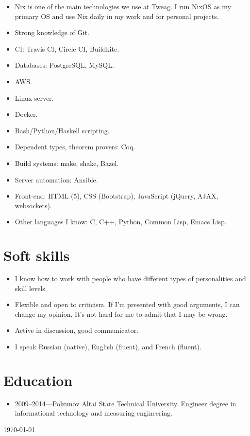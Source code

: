 \documentclass[a4paper,12pt]{article}
\begin{document}
\begin{itemize}[noitemsep]
\item Nix is one of the main technologies we use at Tweag. I run NixOS as my
  primary OS and use Nix daily in my work and for personal projects.
\item Strong knowledge of Git.
\item CI: Travis CI, Circle CI, Buildkite.
\item Databases: PostgreSQL, MySQL.
\item AWS.
\item Linux server.
\item Docker.
\item Bash/Python/Haskell scripting.
\item Dependent types, theorem provers: Coq.
\item Build systems: make, shake, Bazel.
\item Server automation: Ansible.
\item Front-end: HTML (5), CSS (Bootstrap), JavaScript (jQuery, AJAX,
  websockets).
\item Other languages I know: C, C++, Python, Common Lisp, Emacs Lisp.
\end{itemize}

\section*{Soft skills}

\begin{itemize}[noitemsep]
\item I know how to work with people who have different types of
  personalities and skill levels.
\item Flexible and open to criticism. If I'm presented with good arguments,
  I can change my opinion. It's not hard for me to admit that I may be
  wrong.
\item Active in discussion, good communicator.
\item I speak Russian (native), English (fluent), and French (fluent).
\end{itemize}

\section*{Education}

\begin{itemize}[noitemsep]
\item 2009--2014---Polzunov Altai State Technical University. Engineer
  degree in informational technology and measuring engineering.
\end{itemize}

\begin{flushright}
  \today
\end{flushright}
\end{document}
